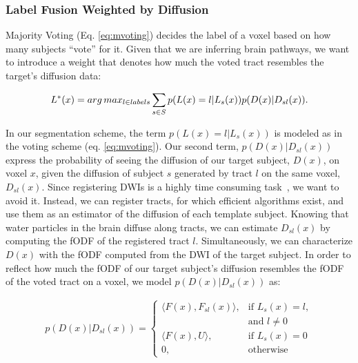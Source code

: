    
\subsubsection{Label Fusion Weighted by Diffusion}
Majority Voting (Eq. \ref{eq:mvoting}) decides the label of a voxel based on
how many subjects ``vote'' for it. Given that we are inferring brain pathways,
we want to introduce a weight that denotes how much the voted tract resembles
the target's diffusion data: 

\begin{equation}
\label{eq:mvoting_weighted}
L^*(x) = arg\,max_{l \in labels} \sum_{s\in S} p(L(x) = l | L_s(x)) p(D(x) | D_{sl}(x)).
\end{equation}

In our segmentation scheme, the term $p(L(x) = l | L_s(x))$ is modeled as in
the voting scheme (eq. \ref{eq:mvoting}). Our second term, $p(D(x) | D_{sl}(x))$
express the probability of seeing the diffusion of our target subject, $D(x)$,
on voxel $x$, given the diffusion of subject $s$ generated by tract $l$ on
the same voxel, $D_{sl}(x)$. Since registering DWIs is a highly time consuming
task~\cite{ODonnell2017}, we want to avoid it. Instead, we can register tracts,
for which efficient algorithms exist, and use them as an estimator of the diffusion
of each template subject. Knowing that water particles in the brain diffuse along
tracts, we can estimate $D_{sl}(x)$ by computing the fODF of the registered tract
$l$. Simultaneously, we can characterize $D(x)$ with the fODF computed from
the DWI of the target subject. In order to reflect how much the fODF of
our target subject's diffusion resembles the fODF of the voted tract on a voxel,
we model $p(D(x) | D_{sl}(x))$ as:

\begin{equation}
\label{eq:inner_odf}
\begin{aligned}
    p(D(x) | D_{sl}(x)) = 
    \begin{cases}
        \langle F(x), F_{sl}(x) \rangle,& \text{if } L_s(x) = l,\\
                        & \text{and } l \neq 0 \\
        \langle F(x), U \rangle,& \text{if } L_s(x) = 0 \\
        0,& \text{otherwise}
    \end{cases} \\
\end{aligned}
\end{equation}

